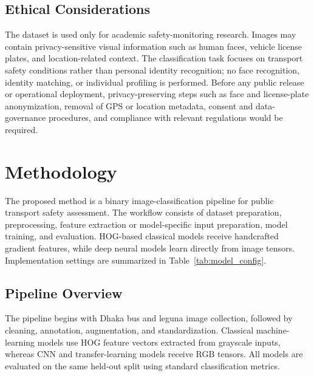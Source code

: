 \documentclass{article}
\begin{document}
\subsection{Ethical Considerations}
The dataset is used only for academic safety-monitoring research. Images may contain privacy-sensitive visual information such as human faces, vehicle license plates, and location-related context. The classification task focuses on transport safety conditions rather than personal identity recognition; no face recognition, identity matching, or individual profiling is performed. Before any public release or operational deployment, privacy-preserving steps such as face and license-plate anonymization, removal of GPS or location metadata, consent and data-governance procedures, and compliance with relevant regulations would be required.

\section{Methodology}
The proposed method is a binary image-classification pipeline for public transport safety assessment. The workflow consists of dataset preparation, preprocessing, feature extraction or model-specific input preparation, model training, and evaluation. HOG-based classical models receive handcrafted gradient features, while deep neural models learn directly from image tensors. Implementation settings are summarized in Table~\ref{tab:model_config}.

\subsection{Pipeline Overview}
The pipeline begins with Dhaka bus and leguna image collection, followed by cleaning, annotation, augmentation, and standardization. Classical machine-learning models use HOG feature vectors extracted from grayscale inputs, whereas CNN and transfer-learning models receive RGB tensors. All models are evaluated on the same held-out split using standard classification metrics.
\end{document}

